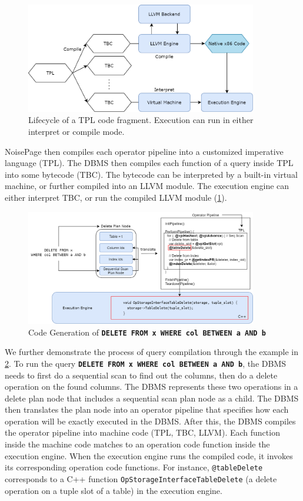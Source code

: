 \documentclass[12pt]{cmuthesis}
\newcommand{\dbSQL}[1]{\texttt{\textbf{#1}}\xspace}
\begin{document}
\begin{figure}[t!]
\centering
\includegraphics[width=0.9\textwidth]{images/LLVM.png}
\caption{Lifecycle of a TPL code fragment. Execution can run in either interpret or compile mode.}
\label{fig:llvm}
\end{figure}
NoisePage then compiles each operator pipeline into a customized imperative language (TPL). The DBMS then compiles each function of a query inside TPL into some bytecode (TBC). The bytecode can be interpreted by a built-in virtual machine, or further compiled into an LLVM module. The execution engine can either interpret TBC, or run the compiled LLVM module (\cref{fig:llvm}).

\begin{figure}[t!]
\centering
\includegraphics[width=0.9\textwidth]{images/CodegenExample.png}
\caption{Code Generation of \dbSQL{DELETE FROM x WHERE col BETWEEN a AND b}}
\label{fig:codegen_example}
\end{figure}

We further demonstrate the process of query compilation through the example in \cref{fig:codegen_example}. To run the query \dbSQL{DELETE FROM x WHERE col BETWEEN a AND b}, the DBMS needs to first do a sequential scan to find out the columns, then do a delete operation on the found columns. The DBMS represents these two operations in a delete plan node that includes a sequential scan plan node as a child. The DBMS then translates the plan node into an operator pipeline that specifies how each operation will be exactly executed in the DBMS. After this, the DBMS compiles the operator pipeline into machine code (TPL, TBC, LLVM). Each function inside the machine code matches to an operation code function inside the execution engine. When the execution engine runs the compiled code, it invokes its corresponding operation code functions. For instance, \texttt{@tableDelete} corresponds to a C++ function \texttt{OpStorageInterfaceTableDelete} (a delete operation on a tuple slot of a table) in the execution engine.
\end{document}
